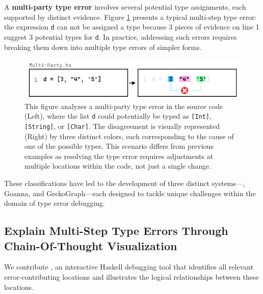 A \textbf{multi-party type error} involves several potential type assignments, each supported by distinct evidence.  Figure \ref{fig:multi-party-example} presents a typical multi-step type error: the expression \texttt{d} can not be assigned a type because 3 pieces of evidence on line 1 suggest 3 potential types for \texttt{d}. In practice, addressing such errors requires breaking them down into multiple type errors of simpler forms.


\begin{figure}[htbp]
\centering  \includegraphics[width=\linewidth]{Multi-Party}
  \caption[This illustration depicts a multi-party type error in Haskell]{
    \label{fig:multi-party-example}
    This figure analyzes a multi-party type error in the source code (Left), where the list \texttt{d} could potentially be typed as \texttt{[Int]}, \texttt{[String]}, or \texttt{[Char]}. The disagreement is visually represented (Right) by three distinct colors, each corresponding to the cause of one of the possible types. This scenario differs from previous examples as resolving the type error requires adjustments at multiple locations within the code, not just a single change.
       }
\end{figure}

These classifications have led to the development of three distinct systems—\chameleon{}, Goanna, and GeckoGraph—each designed to tackle unique challenges within the domain of type error debugging.

\subsection{Explain Multi-Step Type Errors Through Chain-Of-Thought Visualization}


We contribute \textbf{\chameleon{}}, an interactive Haskell debugging tool that identifies all relevant error-contributing locations and illustrates the logical relationships between these locations. 


